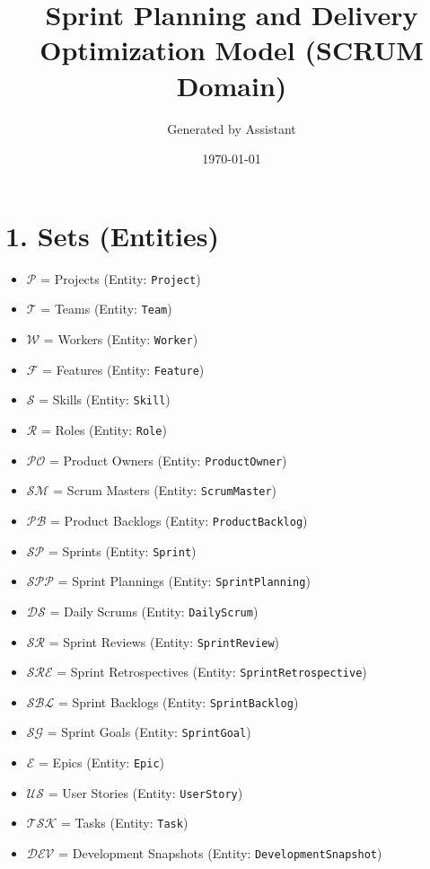 \documentclass[11pt,a4paper]{article}
\title{Sprint Planning and Delivery Optimization Model (SCRUM Domain)}
\author{Generated by Assistant}
\date{\today}
\begin{document}
\maketitle
\tableofcontents
\newpage

\section{1. Sets (Entities)}
\begin{itemize}[leftmargin=2em]
  \item $\mathcal{P}$ = Projects (Entity: \texttt{Project})
  \item $\mathcal{T}$ = Teams (Entity: \texttt{Team})
  \item $\mathcal{W}$ = Workers (Entity: \texttt{Worker})
  \item $\mathcal{F}$ = Features (Entity: \texttt{Feature})
  \item $\mathcal{S}$ = Skills (Entity: \texttt{Skill})
  \item $\mathcal{R}$ = Roles (Entity: \texttt{Role})
  \item $\mathcal{PO}$ = Product Owners (Entity: \texttt{ProductOwner})
  \item $\mathcal{SM}$ = Scrum Masters (Entity: \texttt{ScrumMaster})
  \item $\mathcal{PB}$ = Product Backlogs (Entity: \texttt{ProductBacklog})
  \item $\mathcal{SP}$ = Sprints (Entity: \texttt{Sprint})
  \item $\mathcal{SPP}$ = Sprint Plannings (Entity: \texttt{SprintPlanning})
  \item $\mathcal{DS}$ = Daily Scrums (Entity: \texttt{DailyScrum})
  \item $\mathcal{SR}$ = Sprint Reviews (Entity: \texttt{SprintReview})
  \item $\mathcal{SRE}$ = Sprint Retrospectives (Entity: \texttt{SprintRetrospective})
  \item $\mathcal{SBL}$ = Sprint Backlogs (Entity: \texttt{SprintBacklog})
  \item $\mathcal{SG}$ = Sprint Goals (Entity: \texttt{SprintGoal})
  \item $\mathcal{E}$ = Epics (Entity: \texttt{Epic})
  \item $\mathcal{US}$ = User Stories (Entity: \texttt{UserStory})
  \item $\mathcal{TSK}$ = Tasks (Entity: \texttt{Task})
  \item $\mathcal{DEV}$ = Development Snapshots (Entity: \texttt{DevelopmentSnapshot})

\end{itemize}
\end{document}

